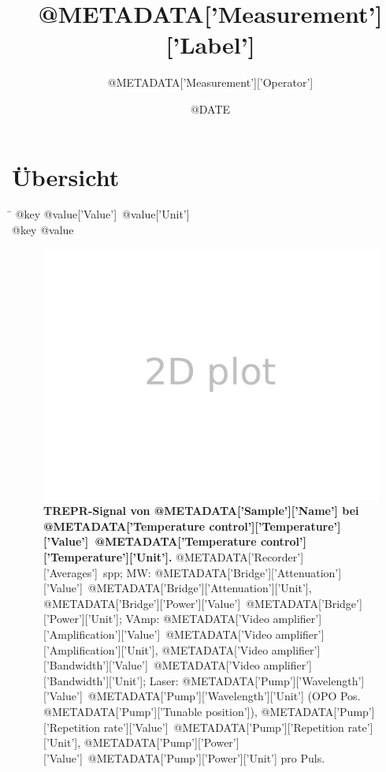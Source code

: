 \documentclass{article}
\begin{document}
\title{{@METADATA['Measurement']['Label']}}
\author{{@METADATA['Measurement']['Operator']}}
\date{{@DATE}}
\maketitle

\section*{Übersicht}

\begin{tabbing}
	\hspace{3.5cm} \= \kill
		{@key} \> {@value['Value']}~{@value['Unit']}
		\\
		{@key} \> {@value}
		\\
\end{tabbing}

\begin{figure}[H]
	\includegraphics[width=\textwidth]{Plotter2D}
	\caption{\textbf{TREPR-Signal von {@METADATA['Sample']['Name']} bei {@METADATA['Temperature control']['Temperature']['Value']}~{@METADATA['Temperature control']['Temperature']['Unit']}.} {@METADATA['Recorder']['Averages']}~spp; MW: {@METADATA['Bridge']['Attenuation']['Value']}~{@METADATA['Bridge']['Attenuation']['Unit']}, {@METADATA['Bridge']['Power']['Value']}~{@METADATA['Bridge']['Power']['Unit']}; VAmp: {@METADATA['Video amplifier']['Amplification']['Value']}~{@METADATA['Video amplifier']['Amplification']['Unit']}, {@METADATA['Video amplifier']['Bandwidth']['Value']}~{@METADATA['Video amplifier']['Bandwidth']['Unit']}; Laser: {@METADATA['Pump']['Wavelength']['Value']}~{@METADATA['Pump']['Wavelength']['Unit']} (OPO Pos. {@METADATA['Pump']['Tunable position']}), {@METADATA['Pump']['Repetition rate']['Value']}~{@METADATA['Pump']['Repetition rate']['Unit']}, {@METADATA['Pump']['Power']['Value']}~{@METADATA['Pump']['Power']['Unit']} pro Puls.} 
\end{figure}
\end{document}
